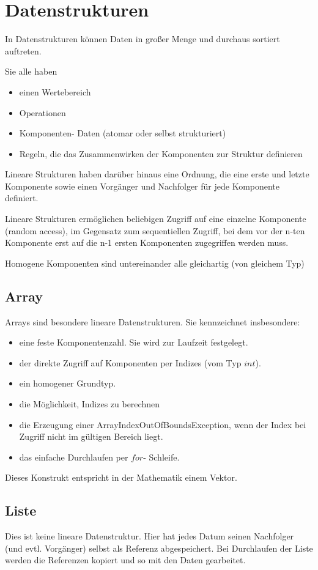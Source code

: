 \documentclass[fleqn]{scrartcl}
\begin{document}
\section{Datenstrukturen}
In Datenstrukturen können Daten in großer Menge und durchaus sortiert auftreten.

Sie alle haben 
\begin{itemize}
\item einen Wertebereich
\item Operationen
\item Komponenten- Daten (atomar oder selbst strukturiert)
\item Regeln, die das Zusammenwirken der Komponenten zur Struktur definieren
\end{itemize}

Lineare Strukturen haben darüber hinaus eine Ordnung, die eine erste und letzte Komponente sowie einen Vorgänger und Nachfolger für jede Komponente definiert.

Lineare Strukturen ermöglichen beliebigen Zugriff auf eine einzelne Komponente (random access), im Gegensatz zum sequentiellen Zugriff, bei dem vor der n-ten Komponente erst auf die n-1 ersten Komponenten zugegriffen werden muss.

Homogene Komponenten sind untereinander alle gleichartig (von gleichem Typ)

\subsection{Array}
Arrays sind besondere lineare Datenstrukturen. Sie kennzeichnet insbesondere:
\begin{itemize}
\item eine feste Komponentenzahl. Sie wird zur Laufzeit festgelegt.
\item der direkte Zugriff auf Komponenten per Indizes (vom Typ $int$).
\item ein homogener Grundtyp.
\item die Möglichkeit, Indizes zu berechnen
\item die Erzeugung einer ArrayIndexOutOfBoundsException, wenn der Index bei Zugriff nicht im gültigen Bereich liegt.
\item das einfache Durchlaufen per $for$- Schleife.
\end{itemize}
Dieses Konstrukt entspricht in der Mathematik einem Vektor.

\newpage
\subsection{Liste}
Dies ist keine lineare Datenstruktur. Hier hat jedes Datum seinen Nachfolger (und evtl. Vorgänger) selbst als Referenz abgespeichert. Bei Durchlaufen der Liste werden die Referenzen kopiert und so mit den Daten gearbeitet.
\end{document}
